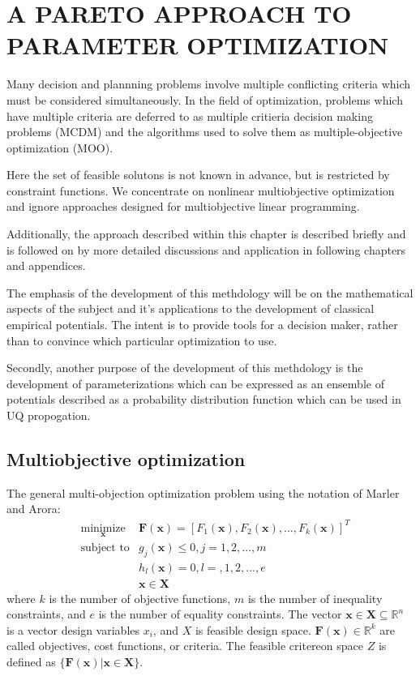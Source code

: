 \chapter{A PARETO APPROACH TO PARAMETER OPTIMIZATION}

Many decision and plannning problems involve multiple conflicting criteria which must be considered simultaneously.  In the field of optimization, problems which have multiple criteria are deferred to as multiple critieria decision making problems (MCDM) and the algorithms used to solve them as multiple-objective optimization (MOO).

Here the set of feasible solutons is not known in advance, but is restricted by constraint functions.  We concentrate on nonlinear multiobjective optimization and ignore approaches designed for multiobjective linear programming.

Additionally, the approach described within this chapter is described briefly and is followed on by more detailed discussions and application in following chapters and appendices.

The emphasis of the development of this methdology will be on the mathematical aspects of the subject and it's applications to the development of classical empirical potentials.  The intent is to provide tools for a decision maker, rather than to convince which particular optimization to use.

Secondly, another purpose of the development of this methdology is the development of parameterizations which can be expressed as an ensemble of potentials described as a probability distribution function which can be used in UQ propogation.

\section{Multiobjective optimization}

The general multi-objection optimization problem using the notation of Marler and Arora\cite{Marler2004_moo_survey}:
\begin{equation}
  \begin{align}
  & \underset{\bm{x}}{\text{minimize}}
        &\bm{F}(\bm{x}) = [
                            F_1(\bm{x}),
                            F_2(\bm{x}),
                            ...,
                            F_k(\bm{x})]^T\\
  & \text{subject to}
        &g_j(\bm{x}) \leq 0, j=1,2,...,m \\
  & &h_l(\bm{x}) = 0, l=,1,2,...,e \\
  & &\bm{x} \in \bm{X}
  \end{align}
\end{equation}
where $k$ is the number of objective functions, $m$ is the number of inequality constraints, and $e$ is the number of equality constraints.  The vector $\bm{x} \in \bm{X} \subseteq \mathbb{R}^n$ is a vector design variables $x_i$, and $X$ is feasible design space.  $\bm{F}(\bm{x}) \in \mathbb{R}^k$ are called objectives, cost functions, or criteria.  The feasible critereon space $Z$ is defined as $\{\bm{F}(\bm{x})|\bm{x}\in\bm{X}\}$.

